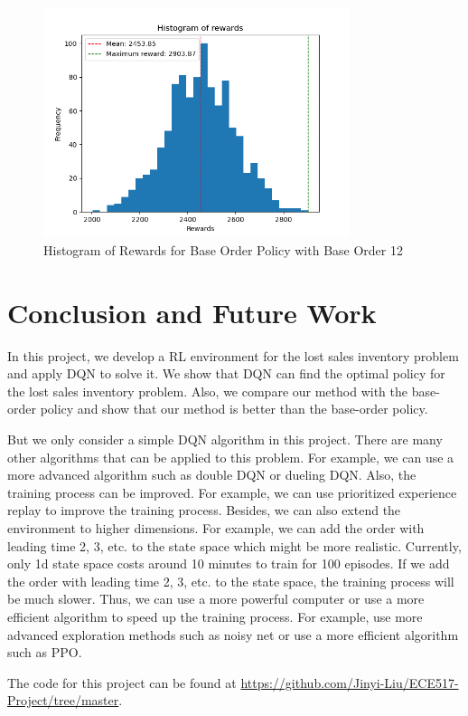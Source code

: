 \begin{figure}[H]
    \centering
    \includegraphics[width=0.8\textwidth]{figure/Histogram of rewards - Base 12.png}
    \caption{Histogram of Rewards for Base Order Policy with Base Order 12}
    \label{fig:hist-base-12}
\end{figure}


\section{Conclusion and Future Work}
In this project, we develop a RL environment for the lost sales inventory problem and apply DQN to solve it. We show that DQN can find the optimal policy for the lost sales inventory problem. Also, we compare our method with the base-order policy and show that our method is better than the base-order policy. 

But we only consider a simple DQN algorithm in this project. There are many other algorithms that can be applied to this problem. For example, we can use a more advanced algorithm such as double DQN or dueling DQN. Also, the training process can be improved. For example, we can use prioritized experience replay to improve the training process. Besides, we can also extend the environment to higher dimensions. For example, we can add the order with leading time 2, 3, etc. to the state space which might be more realistic. Currently, only 1d state space costs around 10 minutes to train for 100 episodes. If we add the order with leading time 2, 3, etc. to the state space, the training process will be much slower. Thus, we can use a more powerful computer or use a more efficient algorithm to speed up the training process. For example, use more advanced exploration methods such as noisy net or use a more efficient algorithm such as PPO.

The code for this project can be found at \url{https://github.com/Jinyi-Liu/ECE517-Project/tree/master}.